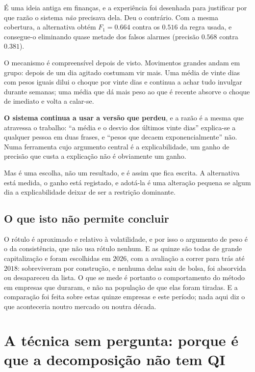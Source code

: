 É uma ideia antiga em finanças, e a experiência foi desenhada para justificar por que razão o
sistema \emph{não} precisava dela. Deu o contrário. Com a mesma cobertura, a alternativa obtém
$F_1 = 0.664$ contra os $0.516$ da regra usada, e consegue-o eliminando quase metade dos falsos
alarmes (precisão $0.568$ contra $0.381$).

O mecanismo é compreensível depois de visto. Movimentos grandes andam em grupo: depois de um dia
agitado costumam vir mais. Uma média de vinte dias com pesos iguais dilui o choque por vinte dias e
continua a achar tudo invulgar durante semanas; uma média que dá mais peso ao que é recente absorve
o choque de imediato e volta a calar-se.

\textbf{O sistema continua a usar a versão que perdeu}, e a razão é a mesma que atravessa o
trabalho: ``a média e o desvio dos últimos vinte dias'' explica-se a qualquer pessoa em duas frases,
e ``pesos que decaem exponencialmente'' não. Numa ferramenta cujo argumento central é a
explicabilidade, um ganho de precisão que custa a explicação não é obviamente um ganho.

Mas é uma escolha, não um resultado, e é assim que fica escrita. A alternativa está medida, o ganho
está registado, e adotá-la é uma alteração pequena se algum dia a explicabilidade deixar de ser a
restrição dominante.

\subsection{O que isto não permite concluir}

O rótulo é aproximado e relativo à volatilidade, e por isso o argumento de peso é o da consistência,
que não usa rótulo nenhum. E as quinze são todas de grande capitalização e foram escolhidas em
$2026$, com a avaliação a correr para trás até $2018$: sobreviveram por construção, e nenhuma delas
saiu de bolsa, foi absorvida ou desapareceu da lista. O que se mede é portanto o comportamento do
método em empresas que duraram, e não na população de que elas foram tiradas. E a comparação foi feita sobre estas quinze empresas e este período; nada
aqui diz o que aconteceria noutro mercado ou noutra década.

\section{A técnica sem pergunta: porque é que a decomposição não tem QI}
\label{sec:av_decomposicao}

